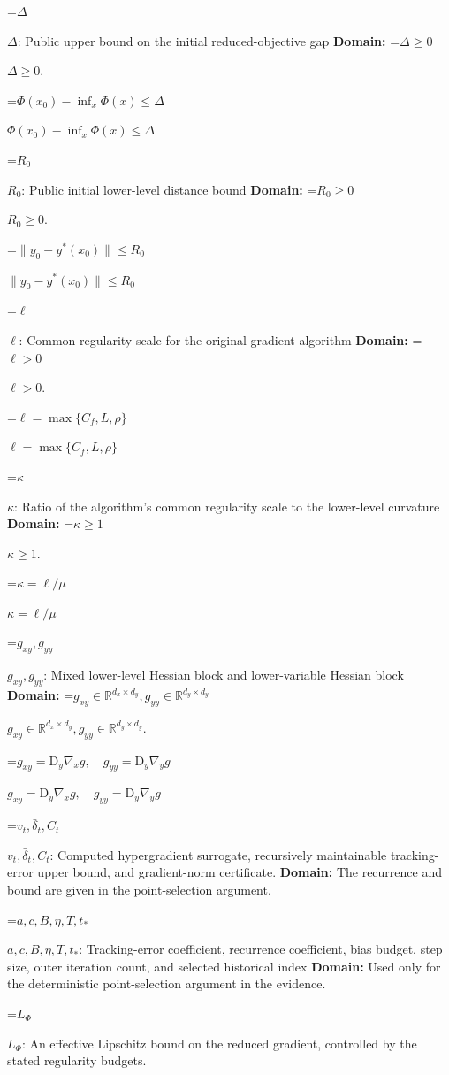 \documentclass[10pt,a4paper]{article}
\newcommand{\AtlasMath}[1]{\par\begingroup\centering\setbox0=\hbox{$\displaystyle #1$}\ifdim\wd0>1.4\linewidth\typeout{ATLAS WIDE FORMULA: \the\wd0}\fi\ifdim\wd0>\linewidth\resizebox{\linewidth}{!}{\box0}\else\box0\fi\par\endgroup}
\newcommand{\AtlasInlineMath}[1]{\begingroup\setbox0=\hbox{$#1$}\ifdim\wd0>.4\linewidth\endgroup\AtlasMath{#1}\else\endgroup$#1$\fi}
\begin{document}
\AtlasInlineMath{\Delta}: Public upper bound on the initial reduced-objective gap \textbf{Domain:} \AtlasInlineMath{\Delta\ge0}.



\AtlasInlineMath{\Phi(x_0)-\inf_x\Phi(x)\le\Delta}



\AtlasInlineMath{R_0}: Public initial lower-level distance bound \textbf{Domain:} \AtlasInlineMath{R_0\ge0}.



\AtlasInlineMath{\|y_0-y^*(x_0)\|\le R_0}



\AtlasInlineMath{\ell}: Common regularity scale for the original-gradient algorithm \textbf{Domain:} \AtlasInlineMath{\ell>0}.



\AtlasInlineMath{\ell=\max\{C_f,L,\rho\}}



\AtlasInlineMath{\kappa}: Ratio of the algorithm's common regularity scale to the lower-level curvature \textbf{Domain:} \AtlasInlineMath{\kappa\ge1}.



\AtlasInlineMath{\kappa=\ell/\mu}



\AtlasInlineMath{g_{xy},g_{yy}}: Mixed lower-level Hessian block and lower-variable Hessian block \textbf{Domain:} \AtlasInlineMath{g_{xy}\in\mathbb R^{d_x\times d_y},g_{yy}\in\mathbb R^{d_y\times d_y}}.



\AtlasInlineMath{g_{xy}=\mathrm D_y\nabla_xg,\quad g_{yy}=\mathrm D_y\nabla_yg}



\AtlasInlineMath{v_t,\bar\delta_t,C_t}: Computed hypergradient surrogate, recursively maintainable tracking-error upper bound, and gradient-norm certificate. \textbf{Domain:} The recurrence and bound are given in the point-selection argument.



\AtlasInlineMath{a,c,B,\eta,T,t_*}: Tracking-error coefficient, recurrence coefficient, bias budget, step size, outer iteration count, and selected historical index \textbf{Domain:} Used only for the deterministic point-selection argument in the evidence.



\AtlasInlineMath{L_\Phi}: An effective Lipschitz bound on the reduced gradient, controlled by the stated regularity budgets.
\end{document}

